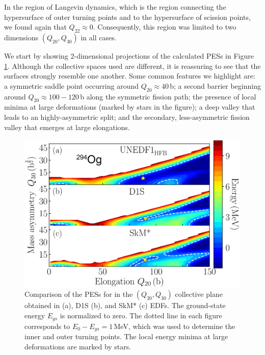 In the region of Langevin dynamics, which is the region connecting the hypersurface of outer turning points and to the hypersurface of scission points, we found again that $Q_{22} \approx 0$. Consequently, this region was limited to two dimensions $(Q_{20}, Q_{30})$ in all cases.

We start by showing 2-dimensional projections of the calculated PESs in Figure \ref{fig:294ogthreepes}. Although the collective spaces used are different, it is reassuring to see that the surfaces strongly resemble one another. Some common features we highlight are: a symmetric saddle point occurring around $Q_{20}\approx 40$\,b; a second barrier beginning around $Q_{20}\approx100-120$\,b along the symmetric fission path; the presence of local minima at large deformations (marked by stars in the figure); a deep valley that leads to an highly-asymmetric split; and the secondary, less-asymmetric fission valley that emerges at large elongations.

\begin{figure}
	\centering
	\includegraphics[width=0.7\linewidth]{TeX_files/294Og_three_PES}
	\caption[PES comparison for $^{294}$Og using EDFs {\hfb}, D1S, and SkM*.]{Comparison of the PESs for \Og{} in the $(Q_{20},Q_{30})$ collective plane obtained in \hfb{} (a), D1S (b), and SkM* (c) EDFs. The ground-state energy $E_{gs}$ is normalized to zero. The dotted line in each figure corresponds to $E_0-E_{gs}=1$\,MeV, which was used to determine the inner and outer turning points. The local energy minima at large deformations are marked by stars.}
	\label{fig:294ogthreepes}
\end{figure}

